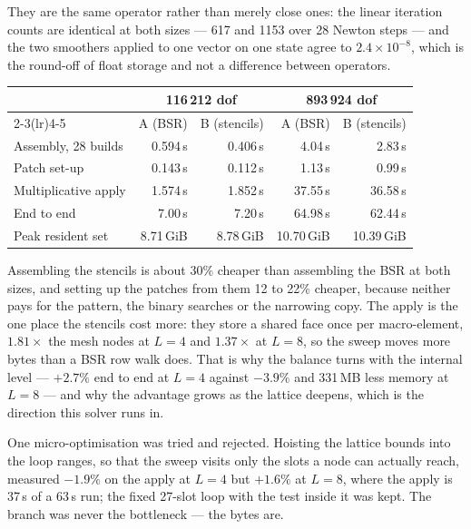 \documentclass[11pt,a4paper]{article}
\begin{document}
They are the same operator rather than merely close ones: the linear iteration counts are identical
at both sizes --- 617 and 1153 over 28 Newton steps --- and the two smoothers applied to one vector
on one state agree to $2.4\times10^{-8}$, which is the round-off of float storage and not a
difference between operators.

\begin{center}
\small
\begin{tabular}{@{}lrrrr@{}}
\toprule
& \multicolumn{2}{c}{116\,212 dof} & \multicolumn{2}{c}{893\,924 dof} \\
\cmidrule(lr){2-3}\cmidrule(lr){4-5}
& A (BSR) & B (stencils) & A (BSR) & B (stencils) \\
\midrule
Assembly, 28 builds  & 0.594\,s  & 0.406\,s  & 4.04\,s   & 2.83\,s \\
Patch set-up         & 0.143\,s  & 0.112\,s  & 1.13\,s   & 0.99\,s \\
Multiplicative apply & 1.574\,s  & 1.852\,s  & 37.55\,s  & 36.58\,s \\
End to end           & 7.00\,s   & 7.20\,s   & 64.98\,s  & 62.44\,s \\
Peak resident set    & 8.71\,GiB & 8.78\,GiB & 10.70\,GiB & 10.39\,GiB \\
\bottomrule
\end{tabular}
\end{center}

Assembling the stencils is about 30\% cheaper than assembling the BSR at both sizes, and setting up
the patches from them 12 to 22\% cheaper, because neither pays for the pattern, the binary searches
or the narrowing copy. The apply is the one place the stencils cost more: they store a shared face
once per macro-element, $1.81\times$ the mesh nodes at $L=4$ and $1.37\times$ at $L=8$, so the sweep
moves more bytes than a BSR row walk does. That is why the balance turns with the internal level ---
$+2.7\%$ end to end at $L=4$ against $-3.9\%$ and 331\,MB less memory at $L=8$ --- and why the
advantage grows as the lattice deepens, which is the direction this solver runs in.

One micro-optimisation was tried and rejected. Hoisting the lattice bounds into the loop ranges, so
that the sweep visits only the slots a node can actually reach, measured $-1.9\%$ on the apply at
$L=4$ but $+1.6\%$ at $L=8$, where the apply is 37\,s of a 63\,s run; the fixed 27-slot loop with
the test inside it was kept. The branch was never the bottleneck --- the bytes are.
\end{document}
